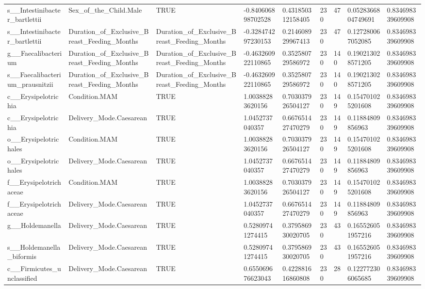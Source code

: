 \begin{longtable}{lllllllll}
s\_\_Intestinibacter\_bartlettii & Sex\_of\_the\_Child.Male & TRUE & -0.840606898702528 & 0.431850312158405 & 230 & 47 & 0.0528366804749691 & 0.834698339609908 \\
s\_\_Intestinibacter\_bartlettii & Duration\_of\_Exclusive\_Breast\_Feeding\_Months & Duration\_of\_Exclusive\_Breast\_Feeding\_Months & -0.328474297230153 & 0.214608929967413 & 230 & 47 & 0.127280067052085 & 0.834698339609908 \\
g\_\_Faecalibacterium & Duration\_of\_Exclusive\_Breast\_Feeding\_Months & Duration\_of\_Exclusive\_Breast\_Feeding\_Months & -0.463260922110865 & 0.352580729586972 & 230 & 140 & 0.190213028571205 & 0.834698339609908 \\
s\_\_Faecalibacterium\_prausnitzii & Duration\_of\_Exclusive\_Breast\_Feeding\_Months & Duration\_of\_Exclusive\_Breast\_Feeding\_Months & -0.463260922110865 & 0.352580729586972 & 230 & 140 & 0.190213028571205 & 0.834698339609908 \\
c\_\_Erysipelotrichia & Condition.MAM & TRUE & 1.00388283620156 & 0.703037926504127 & 230 & 149 & 0.154701025201608 & 0.834698339609908 \\
c\_\_Erysipelotrichia & Delivery\_Mode.Caesarean & TRUE & 1.0452737040357 & 0.667651427470279 & 230 & 149 & 0.11884809856963 & 0.834698339609908 \\
o\_\_Erysipelotrichales & Condition.MAM & TRUE & 1.00388283620156 & 0.703037926504127 & 230 & 149 & 0.154701025201608 & 0.834698339609908 \\
o\_\_Erysipelotrichales & Delivery\_Mode.Caesarean & TRUE & 1.0452737040357 & 0.667651427470279 & 230 & 149 & 0.11884809856963 & 0.834698339609908 \\
f\_\_Erysipelotrichaceae & Condition.MAM & TRUE & 1.00388283620156 & 0.703037926504127 & 230 & 149 & 0.154701025201608 & 0.834698339609908 \\
f\_\_Erysipelotrichaceae & Delivery\_Mode.Caesarean & TRUE & 1.0452737040357 & 0.667651427470279 & 230 & 149 & 0.11884809856963 & 0.834698339609908 \\
g\_\_Holdemanella & Delivery\_Mode.Caesarean & TRUE & 0.52809741274415 & 0.379586930020705 & 230 & 43 & 0.165526051957216 & 0.834698339609908 \\
s\_\_Holdemanella\_biformis & Delivery\_Mode.Caesarean & TRUE & 0.52809741274415 & 0.379586930020705 & 230 & 43 & 0.165526051957216 & 0.834698339609908 \\
c\_\_Firmicutes\_unclassified & Delivery\_Mode.Caesarean & TRUE & 0.655069676623043 & 0.422881616860808 & 230 & 28 & 0.122772306065685 & 0.834698339609908 \\

\end{longtable}
